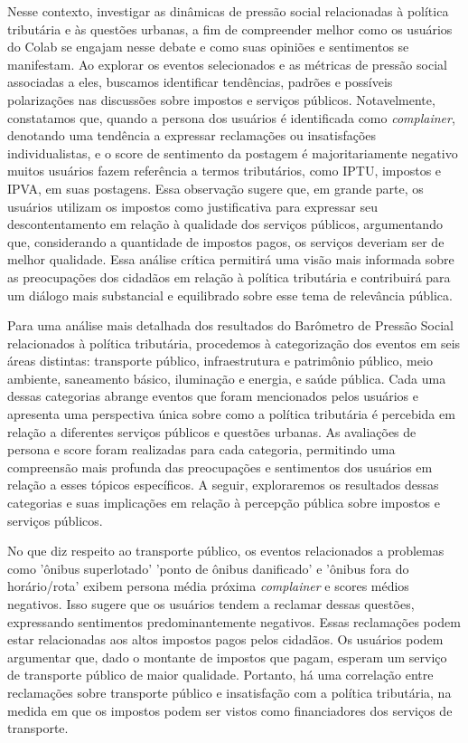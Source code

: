 Nesse contexto, investigar as dinâmicas de pressão social relacionadas à política tributária e às questões urbanas, a fim de compreender melhor como os usuários do Colab se engajam nesse debate e como suas opiniões e sentimentos se manifestam. Ao explorar os eventos selecionados e as métricas de pressão social associadas a eles, buscamos identificar tendências, padrões e possíveis polarizações nas discussões sobre impostos e serviços públicos. Notavelmente, constatamos que, quando a persona dos usuários é identificada como \textit{complainer}, denotando uma tendência a expressar reclamações ou insatisfações individualistas, e o score de sentimento da postagem é majoritariamente negativo muitos usuários fazem referência a termos tributários, como IPTU, impostos e IPVA, em suas postagens. Essa observação sugere que, em grande parte, os usuários utilizam os impostos como justificativa para expressar seu descontentamento em relação à qualidade dos serviços públicos, argumentando que, considerando a quantidade de impostos pagos, os serviços deveriam ser de melhor qualidade. Essa análise crítica permitirá uma visão mais informada sobre as preocupações dos cidadãos em relação à política tributária e contribuirá para um diálogo mais substancial e equilibrado sobre esse tema de relevância pública.

Para uma análise mais detalhada dos resultados do Barômetro de Pressão Social relacionados à política tributária, procedemos à categorização dos eventos em seis áreas distintas: transporte público, infraestrutura e patrimônio público, meio ambiente, saneamento básico, iluminação e energia, e saúde pública. Cada uma dessas categorias abrange eventos que foram mencionados pelos usuários e apresenta uma perspectiva única sobre como a política tributária é percebida em relação a diferentes serviços públicos e questões urbanas. As avaliações de persona e score foram realizadas para cada categoria, permitindo uma compreensão mais profunda das preocupações e sentimentos dos usuários em relação a esses tópicos específicos. A seguir, exploraremos os resultados dessas categorias e suas implicações em relação à percepção pública sobre impostos e serviços públicos.

No que diz respeito ao transporte público, os eventos relacionados a problemas como 'ônibus superlotado' 'ponto de ônibus danificado' e 'ônibus fora do horário/rota' exibem persona média próxima \textit{complainer} e scores médios negativos. Isso sugere que os usuários tendem a reclamar dessas questões, expressando sentimentos predominantemente negativos. Essas reclamações podem estar relacionadas aos altos impostos pagos pelos cidadãos. Os usuários podem argumentar que, dado o montante de impostos que pagam, esperam um serviço de transporte público de maior qualidade. Portanto, há uma correlação entre reclamações sobre transporte público e insatisfação com a política tributária, na medida em que os impostos podem ser vistos como financiadores dos serviços de transporte.

